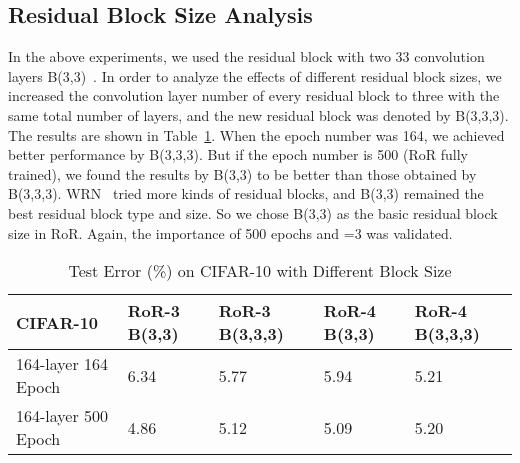 \documentclass[journal]{IEEEtran}
\begin{document}
\subsection{Residual Block Size Analysis}
In the above experiments, we used the residual block with two 33 convolution layers B(3,3)~\cite{he2015resnets}. In order to analyze the effects of different residual block sizes, we increased the convolution layer number of every residual block to three with the same total number of layers, and the new residual block was denoted by B(3,3,3). The results are shown in Table~\ref{tab:DFBlock}. When the epoch number was 164, we achieved better performance by B(3,3,3). But if the epoch number is 500 (RoR fully trained), we found the results by B(3,3) to be better than those obtained by B(3,3,3). WRN~\cite{zagoruyko2016wrn} tried more kinds of residual blocks, and B(3,3) remained the best residual block type and size. So we chose B(3,3) as the basic residual block size in RoR. Again, the importance of 500 epochs and =3 was validated.
\begin{table}[!t]
\renewcommand{\arraystretch}{1.3}
\caption{Test Error (\%) on CIFAR-10 with Different Block Size}
\label{tab:DFBlock}
\centering
\begin{tabular}{|p{1.5cm}|p{1.3cm}|p{1.3cm}|p{1.3cm}|p{1.3cm}|}
\hline
CIFAR-10                     &RoR-3 B(3,3)        &RoR-3 B(3,3,3)  &RoR-4 B(3,3)    &RoR-4 B(3,3,3)  \\ \hline\hline
164-layer 164 Epoch          &6.34                &5.77            &5.94            &5.21    \\\hline
164-layer 500 Epoch          &4.86                &5.12            &5.09            &5.20    \\\hline
\end{tabular}
\end{table}
\par 
\end{document}
